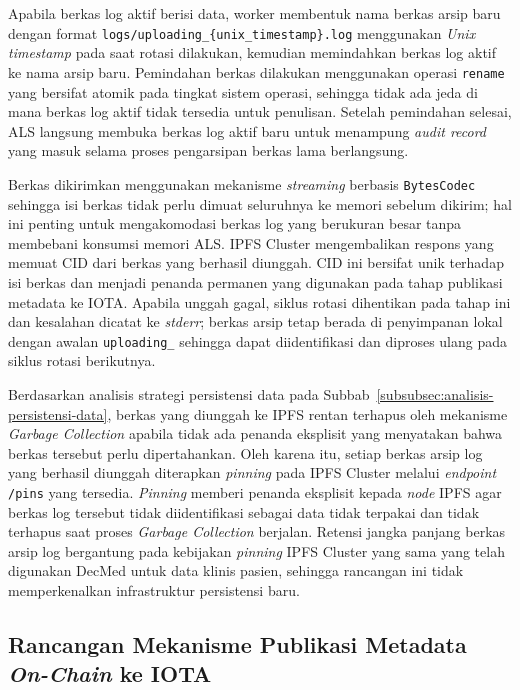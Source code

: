 Apabila berkas log aktif berisi data, worker membentuk nama berkas arsip baru dengan format \texttt{logs/uploading\_\{unix\_timestamp\}.log} menggunakan \textit{Unix timestamp} pada saat rotasi dilakukan, kemudian memindahkan berkas log aktif ke nama arsip baru. Pemindahan berkas dilakukan menggunakan operasi \texttt{rename} yang bersifat atomik pada tingkat sistem operasi, sehingga tidak ada jeda di mana berkas log aktif tidak tersedia untuk penulisan. Setelah pemindahan selesai, ALS langsung membuka berkas log aktif baru untuk menampung \textit{audit record} yang masuk selama proses pengarsipan berkas lama berlangsung.

Berkas dikirimkan menggunakan mekanisme \textit{streaming} berbasis \texttt{BytesCodec} sehingga isi berkas tidak perlu dimuat seluruhnya ke memori sebelum dikirim; hal ini penting untuk mengakomodasi berkas log yang berukuran besar tanpa membebani konsumsi memori ALS. IPFS Cluster mengembalikan respons yang memuat CID dari berkas yang berhasil diunggah. CID ini bersifat unik terhadap isi berkas dan menjadi penanda permanen yang digunakan pada tahap publikasi metadata ke IOTA. Apabila unggah gagal, siklus rotasi dihentikan pada tahap ini dan kesalahan dicatat ke \textit{stderr}; berkas arsip tetap berada di penyimpanan lokal dengan awalan \texttt{uploading\_} sehingga dapat diidentifikasi dan diproses ulang pada siklus rotasi berikutnya.

Berdasarkan analisis strategi persistensi data pada Subbab~\ref{subsubsec:analisis-persistensi-data}, berkas yang diunggah ke IPFS rentan terhapus oleh mekanisme \textit{Garbage Collection} apabila tidak ada penanda eksplisit yang menyatakan bahwa berkas tersebut perlu dipertahankan. Oleh karena itu, setiap berkas arsip log yang berhasil diunggah diterapkan \textit{pinning} pada IPFS Cluster melalui \textit{endpoint} \texttt{/pins} yang tersedia. \textit{Pinning} memberi penanda eksplisit kepada \textit{node} IPFS agar berkas log tersebut tidak diidentifikasi sebagai data tidak terpakai dan tidak terhapus saat proses \textit{Garbage Collection} berjalan. Retensi jangka panjang berkas arsip log bergantung pada kebijakan \textit{pinning} IPFS Cluster yang sama yang telah digunakan DecMed untuk data klinis pasien, sehingga rancangan ini tidak memperkenalkan infrastruktur persistensi baru.

\subsection{Rancangan Mekanisme Publikasi Metadata \textit{On-Chain} ke IOTA}
\label{subsec:rancangan-publikasi-iota}


